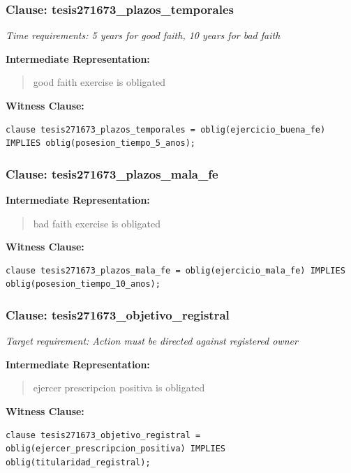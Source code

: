 \documentclass[11pt,a4paper]{article}
\begin{document}
\subsubsection{Clause: tesis271673\_plazos\_temporales}

\textit{Time requirements: 5 years for good faith, 10 years for bad faith}

\textbf{Intermediate Representation:}

\begin{quote}
good faith exercise is obligated
\end{quote}

\textbf{Witness Clause:}

\begin{lstlisting}[style=witnessstyle, language=Witness]
clause tesis271673_plazos_temporales = oblig(ejercicio_buena_fe) IMPLIES oblig(posesion_tiempo_5_anos);
\end{lstlisting}

\subsubsection{Clause: tesis271673\_plazos\_mala\_fe}

\textbf{Intermediate Representation:}

\begin{quote}
bad faith exercise is obligated
\end{quote}

\textbf{Witness Clause:}

\begin{lstlisting}[style=witnessstyle, language=Witness]
clause tesis271673_plazos_mala_fe = oblig(ejercicio_mala_fe) IMPLIES oblig(posesion_tiempo_10_anos);
\end{lstlisting}

\subsubsection{Clause: tesis271673\_objetivo\_registral}

\textit{Target requirement: Action must be directed against registered owner}

\textbf{Intermediate Representation:}

\begin{quote}
ejercer prescripcion positiva is obligated
\end{quote}

\textbf{Witness Clause:}

\begin{lstlisting}[style=witnessstyle, language=Witness]
clause tesis271673_objetivo_registral = oblig(ejercer_prescripcion_positiva) IMPLIES oblig(titularidad_registral);
\end{lstlisting}
\end{document}
